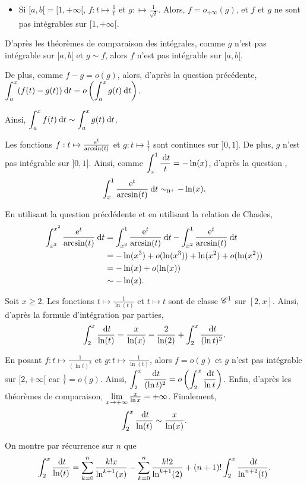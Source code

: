 \documentclass[oneside,11pt]{book}
\begin{document}
\begin{solution*}
\begin{itemize}
\item Si $[a, b[ = [1, +\infty[$, $f : t \mapsto \frac{1}{t}$ et $g : \mapsto \frac{1}{\sqrt{t}}$. Alors, $f = o_{+\infty}(g)$,  et $f$ et $g$ ne sont pas intégrables sur $[1, +\infty[$.
\end{itemize}

\squ D'après les théorèmes de comparaison des intégrales, comme $g$ n'est pas intégrable sur $[a, b[$ et $g \sim f$, alors $f$ n'est pas intégrable sur $[a, b[$.

De plus, comme $f - g = o(g)$, alors, d'après la question précédente, $\displaystyle \int_a^x (f(t) - g(t)) \:{\text d}t = o\left(\displaystyle \int_a^x g(t) \:{\text d}t\right)$.

Ainsi, $\displaystyle \int_a^x f(t) \:{\text d}t \sim \displaystyle \int_a^x g(t) \:{\text d}t$.

\partie{}

\Qu Les fonctions $f : t \mapsto \frac{\operatorname{e}^t}{\arcsin(t)}$ et $g : t \mapsto \frac{1}{t}$ sont continues sur $]0, 1]$. De plus, $g$ n'est pas intégrable sur $]0, 1]$. Ainsi, comme $\displaystyle \int_x^1 \frac{\:{\text d}t}{t} = - \ln(x)$, d'après la question ,
\[
\displaystyle \int_x^1 \frac{\operatorname{e}^t}{\arcsin(t)} \:{\text d}t \sim_{0^+} -\ln(x).
\]

\squ En utilisant la question précdédente et en utilisant la relation de Chasles,
\begin{align*}
\displaystyle \int_{x^3}^{x^2} \frac{\operatorname{e}^t}{\arcsin(t)} \:{\text d}t &= \displaystyle \int_{x^3}^1 \frac{\operatorname{e}^t}{\arcsin(t)} \:{\text d}t - \displaystyle \int_{x^2}^1 \frac{\operatorname{e}^t}{\arcsin(t)} \:{\text d}t \\
&= -\ln(x^3) + o(\ln(x^3)) + \ln(x^2) + o(\ln(x^2)) \\
&= - \ln(x) + o(\ln(x)) \\
&\sim - \ln(x).
\end{align*}

\Qu Soit $x \geq 2$. Les fonctions $t \mapsto \frac{1}{\ln(t)}$ et $t \mapsto t$ sont de classe $\mathscr{C}^1$ sur $[2, x]$. Ainsi, d'après la formule d'intégration par parties,
\[
\displaystyle \int_2^x \frac{\:{\text d}t}{\ln(t)} = \frac{x}{\ln(x)} - \frac{2}{\ln(2)} + \displaystyle \int_2^x \frac{\:{\text d}t}{(\ln t)^2}.
\]

En posant $f : t \mapsto \frac{1}{(\ln t)^2}$ et $g : t \mapsto \frac{1}{\ln(t)}$, alors $f = o(g)$ et $g$ n'est pas intégrable sur $[2,+\infty[$ car $\frac{1}{t} = o(g)$. Ainsi, $\displaystyle \int_2^x \frac{\:{\text d}t}{(\ln t)^2} = o\left(\displaystyle \int_2^x \frac{\:{\text d}t}{\ln t}\right)$. Enfin, d'après les théorèmes de comparaison, $\lim\limits_{x\to+\infty} \frac{x}{\ln x} = +\infty$. Finalement,
\[
\displaystyle \int_2^x \frac{\:{\text d}t}{\ln(t)} \sim \frac{x}{\ln(x)}.
\]

\squ On montre par récurrence sur $n$ que
\[
\displaystyle \int_2^x \frac{\:{\text d}t}{\ln(t)} = \sum\limits_{k=0}^n \frac{k! x}{\ln^{k+1}(x)} - \sum\limits_{k=0}^n \frac{k! 2}{\ln^{k+1}(2)} + (n+1)! \displaystyle \int_2^x \frac{\:{\text d}t}{\ln^{n+2}(t)}.
\]


\end{solution*}
\end{document}
